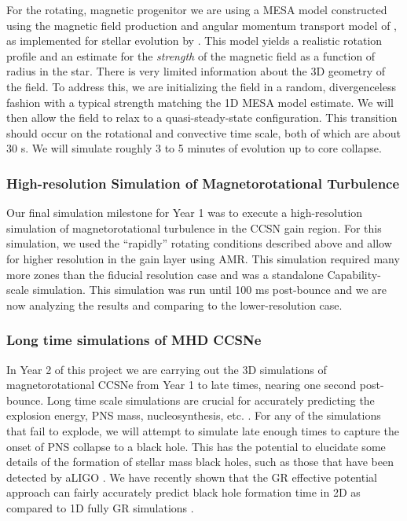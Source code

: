 \documentclass[12pt]{article}
\begin{document}
For the rotating, magnetic progenitor we are using a MESA model constructed using the magnetic field production and angular momentum transport model of \citet{spruit:2002}, as implemented for stellar evolution by \citet{heger:2005, paxton:2015}.
This model yields a realistic rotation profile and an estimate for the {\it strength} of the magnetic field as a function of radius in the star. 
There is very limited information about the 3D geometry of the field.
To address this, we are initializing the field in a random, divergenceless fashion with a typical strength matching the 1D MESA model estimate.
We will then allow the field to relax to a quasi-steady-state configuration.
This transition should occur on the rotational and convective time scale, both of which are about 30 s. 
We will simulate roughly 3 to 5 minutes of evolution up to core collapse.

\subsubsection{High-resolution Simulation of Magnetorotational Turbulence}

Our final simulation milestone for Year 1 was to execute a high-resolution simulation of magnetorotational turbulence in the CCSN gain region. 
For this simulation, we used the ``rapidly'' rotating conditions described above and allow for higher resolution in the gain layer using AMR.
This simulation required many more zones than the fiducial resolution case and was a standalone Capability-scale simulation.
This simulation was run until 100 ms post-bounce and we are now analyzing the results and comparing to the lower-resolution case. 

\subsubsection{Long time simulations of MHD CCSNe}

In Year 2 of this project we are carrying out the 3D simulations of magnetorotational CCSNe from Year 1 to late times, nearing one second post-bounce.
Long time scale simulations are crucial for accurately predicting the explosion energy, PNS mass, nucleosynthesis, etc. \citep{bruenn:2016, muller:2017}.
For any of the simulations that fail to explode, we will attempt to simulate late enough times to capture the onset of PNS collapse to a black hole.
This has the potential to elucidate some details of the formation of stellar mass black holes, such as those that have been detected by aLIGO \citep{abbott:2016, abbott:2017}.
We have recently shown \citep{pan:2018} that the GR effective potential approach can fairly accurately predict black hole formation time in 2D as compared to 1D fully GR simulations \citep{oconnor:2011}.
\end{document}
